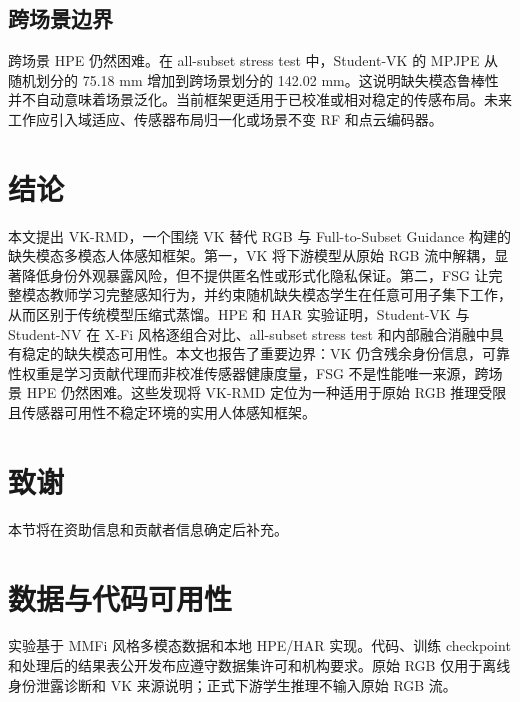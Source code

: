 ﻿\documentclass[UTF8,twocolumn]{ctexart}
\newcommand{\method}{VK-RMD}
\newcommand{\mpjpe}{MPJPE}
\begin{document}
\subsection{跨场景边界}
跨场景 HPE 仍然困难。在 all-subset stress test 中，Student-VK 的 \mpjpe{} 从随机划分的 75.18 mm 增加到跨场景划分的 142.02 mm。这说明缺失模态鲁棒性并不自动意味着场景泛化。当前框架更适用于已校准或相对稳定的传感布局。未来工作应引入域适应、传感器布局归一化或场景不变 RF 和点云编码器。

\section{结论}
本文提出 \method{}，一个围绕 VK 替代 RGB 与 Full-to-Subset Guidance 构建的缺失模态多模态人体感知框架。第一，VK 将下游模型从原始 RGB 流中解耦，显著降低身份外观暴露风险，但不提供匿名性或形式化隐私保证。第二，FSG 让完整模态教师学习完整感知行为，并约束随机缺失模态学生在任意可用子集下工作，从而区别于传统模型压缩式蒸馏。HPE 和 HAR 实验证明，Student-VK 与 Student-NV 在 X-Fi 风格逐组合对比、all-subset stress test 和内部融合消融中具有稳定的缺失模态可用性。本文也报告了重要边界：VK 仍含残余身份信息，可靠性权重是学习贡献代理而非校准传感器健康度量，FSG 不是性能唯一来源，跨场景 HPE 仍然困难。这些发现将 \method{} 定位为一种适用于原始 RGB 推理受限且传感器可用性不稳定环境的实用人体感知框架。

\section*{致谢}
本节将在资助信息和贡献者信息确定后补充。

\section*{数据与代码可用性}
实验基于 MMFi 风格多模态数据和本地 HPE/HAR 实现。代码、训练 checkpoint 和处理后的结果表公开发布应遵守数据集许可和机构要求。原始 RGB 仅用于离线身份泄露诊断和 VK 来源说明；正式下游学生推理不输入原始 RGB 流。

\balance
\end{document}
